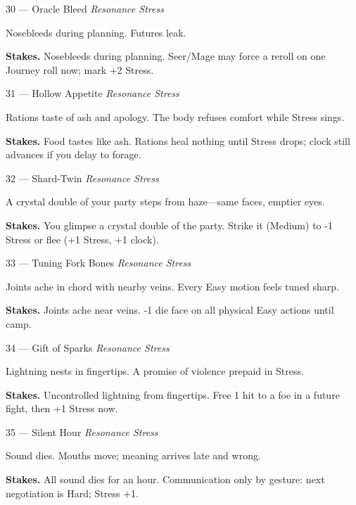 \begin{encounterentry}{30 --- Oracle Bleed}
\textit{Resonance Stress}

Nosebleeds during planning. Futures leak.

\textbf{Stakes.} Nosebleeds during planning. Seer/Mage may force a reroll on one Journey roll now; mark +2 Stress.
\end{encounterentry}

\begin{encounterentry}{31 --- Hollow Appetite}
\textit{Resonance Stress}

Rations taste of ash and apology. The body refuses comfort while Stress sings.

\textbf{Stakes.} Food tastes like ash. Rations heal nothing until Stress drops; clock still advances if you delay to forage.
\end{encounterentry}

\begin{encounterentry}{32 --- Shard-Twin}
\textit{Resonance Stress}

A crystal double of your party steps from haze---same faces, emptier eyes.

\textbf{Stakes.} You glimpse a crystal double of the party. Strike it (Medium) to -1 Stress or flee (+1 Stress, +1 clock).
\end{encounterentry}

\begin{encounterentry}{33 --- Tuning Fork Bones}
\textit{Resonance Stress}

Joints ache in chord with nearby veins. Every Easy motion feels tuned sharp.

\textbf{Stakes.} Joints ache near veins. -1 die face on all physical Easy actions until camp.
\end{encounterentry}

\begin{encounterentry}{34 --- Gift of Sparks}
\textit{Resonance Stress}

Lightning nests in fingertips. A promise of violence prepaid in Stress.

\textbf{Stakes.} Uncontrolled lightning from fingertips. Free 1 hit to a foe in a future fight, then +1 Stress now.
\end{encounterentry}

\begin{encounterentry}{35 --- Silent Hour}
\textit{Resonance Stress}

Sound dies. Mouths move; meaning arrives late and wrong.

\textbf{Stakes.} All sound dies for an hour. Communication only by gesture: next negotiation is Hard; Stress +1.
\end{encounterentry}

